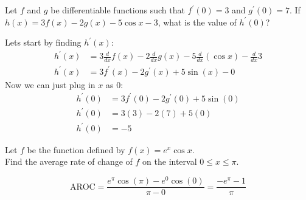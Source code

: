 \documentclass[12pt,letterpaper, onecolumn]{exam}
\begin{document}
\begin{questions}

\pagebreak

\question Let $f$ and $g$ be differentiable functions such that $f^\prime(0)=3$ and $g^\prime (0) = 7$. If $h(x)=3f(x)-2g(x)-5\cos x -3$, what is the value of $h^\prime(0)$?

	
    \begin{solution}
	Lets start by finding $h^\prime(x)$:
	\begin{align*}
		h^\prime(x) &= 3 \frac{d}{dx} f(x) - 2 \frac{d}{dx} g(x) - 5 \frac {d}{dx} (\cos x) - \frac {d}{dx} 3 \\
		h^\prime(x) &= 3f^\prime(x) - 2g^\prime(x) + 5\sin (x) - 0
	\end{align*}
	Now we can just plug in $x$ as $0$:
	\begin{align*}
		h^\prime(0) &= 3f^\prime(0) - 2g^\prime(0) + 5\sin (0) \\
		h^\prime(0) &= 3(3) - 2(7) + 5(0) \\
		h^\prime(0) &= \boxed{-5}
	\end{align*}
    \end{solution}

\pagebreak

\question Let $f$ be the function defined by $f(x) = e^{x} \cos x$. \\ Find the average rate of change of $f$ on the interval $ 0 \leq x \leq \pi $.

	\begin{solution}
		$$\text{AROC} = \frac{e^{\pi} \cos(\pi) - e^{0} \cos(0)}{\pi - 0} = \boxed{\frac{-e^{\pi}-1}{\pi}}$$
	\end{solution}


\end{questions}
\end{document}
